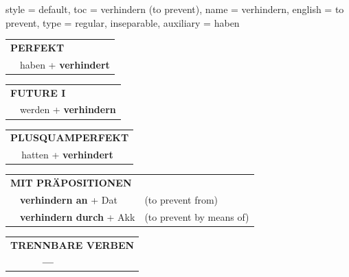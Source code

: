 \begin{verbentry}{
  style = {default},
  toc = {verhindern (to prevent)},
  name = {verhindern},
  english = {to prevent},
  type = {regular, inseparable},
  auxiliary = {haben}
}
 \begin{tabular}{rl}
     \multicolumn{2}{l}{\textbf{PERFEKT}}\\
   & haben + \textbf{verhindert}\\
  \end{tabular}
\hfill
   \begin{tabular}{rl}
    \multicolumn{2}{l}{\textbf{FUTURE I} }\\
   & werden + \textbf{verhindern}\\
  \end{tabular}
\hfill
   \begin{tabular}{rl}
      \multicolumn{2}{l}{\textbf{PLUSQUAMPERFEKT}}\\
   & hatten + \textbf{verhindert}\\
  \end{tabular}

   \vspace{10pt}

   \begin{tabular}{lll}
      \multicolumn{3}{l}{\textbf{MIT PRÄPOSITIONEN}}\\
& \textbf{verhindern an} + Dat & (to prevent from)\\
& \textbf{verhindern durch} + Akk & (to prevent by means of)\\
\end{tabular}
  \hfill
   \begin{tabular}{lll}
\multicolumn{3}{l}{\textbf{TRENNBARE VERBEN}}\\
& \textbf{---} & \\
\end{tabular}

  \vspace{-5pt}
\end{verbentry}

